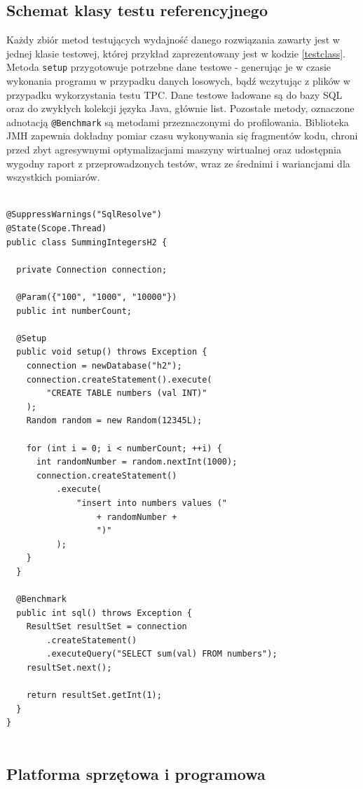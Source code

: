\documentclass[12pt,twoside,openright]{extarticle}
\begin{document}
\subsection{Schemat klasy testu referencyjnego}


    Każdy zbiór metod testujących wydajność danego rozwiązania zawarty jest w jednej klasie testowej, której przykład zaprezentowany jest w kodzie \ref{testclass}. Metoda \texttt{setup} przygotowuje potrzebne dane testowe - generując je w czasie wykonania programu w przypadku danych losowych, bądź wczytując z plików w przypadku wykorzystania testu TPC. Dane testowe ładowane są do bazy SQL oraz do zwykłych kolekcji języka Java, głównie list. Pozostałe metody, oznaczone adnotacją \texttt{@Benchmark} są metodami przeznaczonymi do profilowania. Biblioteka JMH zapewnia dokładny pomiar czasu wykonywania się fragmentów kodu, chroni przed zbyt agresywnymi optymalizacjami maszyny wirtualnej oraz udostępnia wygodny raport z przeprowadzonych testów, wraz ze średnimi i wariancjami dla wszystkich pomiarów.

\begin{lstlisting}[label=testclass, caption=Przykładowa klasa JMH]

@SuppressWarnings("SqlResolve")
@State(Scope.Thread)
public class SummingIntegersH2 {
  
  private Connection connection;
  
  @Param({"100", "1000", "10000"})
  public int numberCount;
  
  @Setup
  public void setup() throws Exception {
    connection = newDatabase("h2");
    connection.createStatement().execute(
        "CREATE TABLE numbers (val INT)"
    );
    Random random = new Random(12345L);
    
    for (int i = 0; i < numberCount; ++i) {
      int randomNumber = random.nextInt(1000);
      connection.createStatement()
          .execute(
              "insert into numbers values ("
                  + randomNumber +
                  ")"
          );
    }
  }
  
  @Benchmark
  public int sql() throws Exception {
    ResultSet resultSet = connection
        .createStatement()
        .executeQuery("SELECT sum(val) FROM numbers");
    resultSet.next();
    
    return resultSet.getInt(1);
  }
}


\end{lstlisting}

\subsection{Platforma sprzętowa i programowa}
\end{document}
